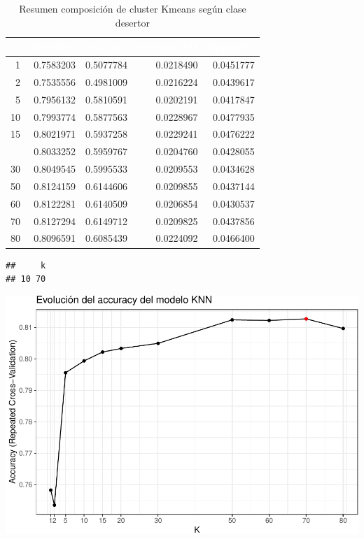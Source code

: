 \documentclass[]{article}
\begin{document}
\begin{table}[!h]

\caption{\label{tab:kmeans_2_resumen}Resumen composición de cluster Kmeans según clase desertor}
\centering
\begin{tabular}[t]{rrrrr}
\toprule
\rowcolor{black}  \multicolumn{1}{c}{\textcolor{white}{\textbf{k}}} & \multicolumn{1}{c}{\textcolor{white}{\textbf{Accuracy}}} & \multicolumn{1}{c}{\textcolor{white}{\textbf{Kappa}}} & \multicolumn{1}{c}{\textcolor{white}{\textbf{AccuracySD}}} & \multicolumn{1}{c}{\textcolor{white}{\textbf{KappaSD}}}\\
\midrule
\rowcolor{gray!6}  1 & 0.7583203 & 0.5077784 & 0.0218490 & 0.0451777\\
2 & 0.7535556 & 0.4981009 & 0.0216224 & 0.0439617\\
\rowcolor{gray!6}  5 & 0.7956132 & 0.5810591 & 0.0202191 & 0.0417847\\
10 & 0.7993774 & 0.5877563 & 0.0228967 & 0.0477935\\
\rowcolor{gray!6}  15 & 0.8021971 & 0.5937258 & 0.0229241 & 0.0476222\\
\addlinespace
20 & 0.8033252 & 0.5959767 & 0.0204760 & 0.0428055\\
\rowcolor{gray!6}  30 & 0.8049545 & 0.5995533 & 0.0209553 & 0.0434628\\
50 & 0.8124159 & 0.6144606 & 0.0209855 & 0.0437144\\
\rowcolor{gray!6}  60 & 0.8122281 & 0.6140509 & 0.0206854 & 0.0430537\\
70 & 0.8127294 & 0.6149712 & 0.0209825 & 0.0437856\\
\addlinespace
\rowcolor{gray!6}  80 & 0.8096591 & 0.6085439 & 0.0224092 & 0.0466400\\
\bottomrule
\end{tabular}
\end{table}

\begin{lstlisting}
##     k
## 10 70
\end{lstlisting}

\includegraphics{analisis_de_muchos_modelos_files/figure-latex/unnamed-chunk-13-1.pdf}
\end{document}
